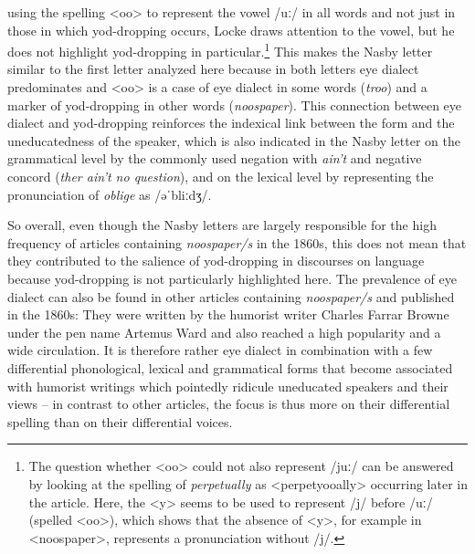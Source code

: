 using the spelling <oo> to represent the vowel /uː/ in all words and not just in those in which yod-dropping occurs, Locke draws attention to the vowel, but he does not highlight yod-dropping in particular.\footnote{The question whether <oo> could not also represent /juː/ can be answered by looking at the spelling of \emph{perpetually} as <perpetyooally> occurring later in the article. Here, the <y> seems to be used to represent /j/ before /uː/ (spelled <oo>), which shows that the absence of <y>, for example in <noospaper>, represents a pronunciation without /j/.} This makes the Nasby letter similar to the first letter analyzed here because in both letters eye dialect predominates and <oo> is a case of eye dialect in some words (\emph{troo}) and a marker of yod-dropping in other words (\emph{noospaper}). This connection between eye dialect and yod-dropping reinforces the indexical link between the form and the uneducatedness of the speaker, which is also indicated in the Nasby letter on the grammatical level by the commonly used negation with \emph{ain’t} and negative concord (\emph{ther ain’t no question}), and on the lexical level by representing the pronunciation of \emph{oblige} as /əˈbliːdʒ/.

So overall, even though the Nasby letters are largely responsible for the high frequency of articles containing \emph{noospaper/s} in the 1860s, this does not mean that they contributed to the salience of yod-dropping in discourses on language because yod-dropping is not particularly highlighted here. The prevalence of eye dialect can also be found in other articles containing \emph{noospaper/s} and published in the 1860s: They were written by the humorist writer Charles Farrar Browne under the pen name Artemus Ward and also reached a high popularity and a wide circulation. It is therefore rather eye dialect in combination with a few differential phonological, lexical and grammatical forms that become associated with humorist writings which pointedly ridicule uneducated speakers and their views – in contrast to other articles, the focus is thus more on their differential spelling than on their differential voices.

